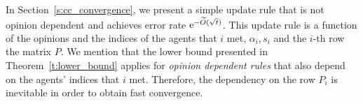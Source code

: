 In Section~\ref{s:cc_convergence}, we present a simple update rule that
is not opinion dependent and  achieves error rate
$\mathrm{e}^{-\widetilde{O}(\sqrt{t})}$.
This update rule is a function of the opinions and the indices of the agents
that $i$ met, $\alpha_i,s_i$ and the $i$-th row the matrix $P$.
We mention that the lower bound presented in Theorem~\ref{t:lower_bound}
applies for \emph{opinion dependent rules} that also depend on the
agents' indices that $i$ met.  Therefore, the dependency on the row $P_i$ is
inevitable in order to obtain fast convergence.
